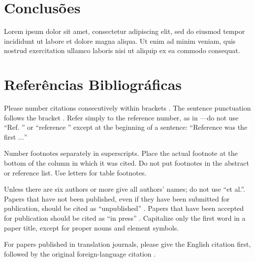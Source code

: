 \documentclass[conference]{IEEEtran}
\begin{document}
\section{Conclusões} %
Lorem ipsum dolor sit amet, consectetur adipiscing elit, sed do eiusmod tempor incididunt ut labore et dolore magna aliqua. Ut enim ad minim veniam, quis nostrud exercitation ullamco laboris nisi ut aliquip ex ea commodo consequat.

\section*{Referências Bibliográficas}

Please number citations consecutively within brackets \cite{b1}. The 
sentence punctuation follows the bracket \cite{b2}. Refer simply to the reference 
number, as in \cite{b3}---do not use ``Ref. \cite{b3}'' or ``reference \cite{b3}'' except at 
the beginning of a sentence: ``Reference \cite{b3} was the first $\ldots$''

Number footnotes separately in superscripts. Place the actual footnote at 
the bottom of the column in which it was cited. Do not put footnotes in the 
abstract or reference list. Use letters for table footnotes.

Unless there are six authors or more give all authors' names; do not use 
``et al.''. Papers that have not been published, even if they have been 
submitted for publication, should be cited as ``unpublished'' \cite{b4}. Papers 
that have been accepted for publication should be cited as ``in press'' \cite{b5}. 
Capitalize only the first word in a paper title, except for proper nouns and 
element symbols.

For papers published in translation journals, please give the English 
citation first, followed by the original foreign-language citation \cite{b6}.

\end{document}
